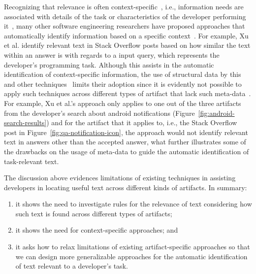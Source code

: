 Recognizing that relevance is often context-specific~\cite{Bavota2016}, i.e., information needs are associated with details of the task 
or characteristics of the developer performing it~\cite{Robillard2015}, many other software engineering researchers 
have proposed approaches that 
automatically identify information based on a specific context~\cite{Ye2016, silva2019, Xu2017}.
For example, Xu et al. identify relevant text in Stack Overflow posts 
based on how similar the text within an answer is with regards to a input query, which represents the developer's programming task.
Although this assists in the automatic identification of context-specific information, 
the use of structural data by this and other techniques~\cite{silva2019, Li2018}
limits their adoption since it is evidently
not possible to apply such techniques
across different types of artifact  that lack such meta-data~\cite{Bavota2016, arnaoudova2015}.
For example, Xu et al.'s approach
only applies to one out of the three artifacts 
from the developer's search 
about android notifications (Figure~\ref{fig:android-search-results})
and for the artifact that it applies to, i.e., the Stack Overflow post in Figure~\ref{fig:qa-notification-icon}, 
the approach would not identify relevant text in answers other than the accepted answer,
what further illustrates some of the drawbacks on the usage of meta-data 
to guide the automatic identification of task-relevant text.


  




The discussion above  evidences limitations of existing techniques 
in assisting developers in locating useful text across different kinds of artifacts.
In summary:

\begin{enumerate}
    \item it shows the need to investigate rules for the relevance of text 
    considering how such text is found across different types of artifacts;
    \item it shows the need for context-specific approaches; and 
    \item it asks how to relax limitations of existing
    artifact-specific approaches so that we can design 
    more generalizable approaches for the automatic identification
    of text relevant to a developer's task.
\end{enumerate}


